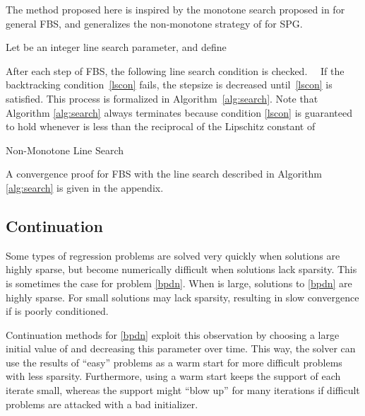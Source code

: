 \documentclass{amsart}
\renewcommand\Re{\operatorname{\mathfrak{Re}}}
\newcommand{\eqn}[2]{}
\newcommand{\ra}{\rangle}
\newcommand{\la}{\langle}
\newcommand{\kp}{^{k+1}}
\theoremstyle{definition}
\begin{document}
The method proposed here is inspired by the monotone search proposed in \cite{BT09} for general FBS, and generalizes the non-monotone strategy of \cite{GLL86} for SPG.  
    
     Let  be an integer line search parameter, and define
  
After each step of FBS, the following line search condition is checked.~\
  \eqn{lscon}{
    f(x\kp)<  \hat f^k + \Re  \la  x\kp -x^k, \nabla f(x^k) \ra\\+ \frac{1}{2\tau^k}  \| x\kp-x^k\|^2.
} 
If the backtracking condition~\eqref{lscon} fails, the stepsize is decreased until~\eqref{lscon} is satisfied. This process is formalized in Algorithm~\ref{alg:search}.   Note that Algorithm \ref{alg:search} always terminates because condition \eqref{lscon} is guaranteed to hold whenever  is less than the reciprocal of the Lipschitz constant of 
    
    \begin{algorithm}[t]
\caption{Non-Monotone Line Search }
\label{alg:search}
\begin{algorithmic}
\State 
\State 
\EndWhile
\end{algorithmic}
\end{algorithm}

A convergence proof for FBS with the line search described in Algorithm \ref{alg:search} is given in the appendix.   

\subsection{Continuation}
Some types of regression problems are solved very quickly when solutions are highly sparse, but become numerically difficult when solutions lack sparsity. This is sometimes the case for problem \eqref{bpdn}.  When  is large,  solutions to \eqref{bpdn} are highly sparse.  For small  solutions may lack sparsity, resulting in slow convergence if  is poorly conditioned.

    Continuation methods for  \eqref{bpdn} exploit this observation by choosing a large initial value of  and  decreasing this parameter over time.  This way, the solver can use the results of ``easy'' problems as a warm start for more difficult problems with less sparsity.   Furthermore, using a warm start keeps the support of each iterate small, whereas the support might ``blow up'' for many iterations if difficult problems are attacked with a bad initializer.   
    
\end{document}
